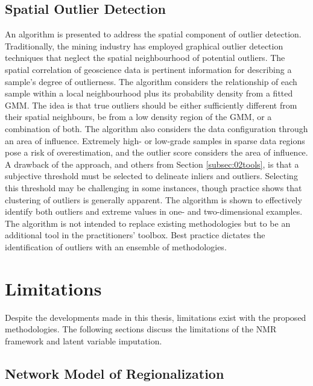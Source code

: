 \subsection{Spatial Outlier Detection}
\label{subsec:07outlier}

An algorithm is presented to address the spatial component of outlier detection. Traditionally, the mining industry has employed graphical outlier detection techniques that neglect the spatial neighbourhood of potential outliers. The spatial correlation of geoscience data is pertinent information for describing a sample's degree of outlierness. The algorithm considers the relationship of each sample within a local neighbourhood plus its probability density from a fitted \gls{GMM}. The idea is that true outliers should be either sufficiently different from their spatial neighbours, be from a low density region of the \gls{GMM}, or a combination of both. The algorithm also considers the data configuration through an area of influence. Extremely high- or low-grade samples in sparse data regions pose a risk of overestimation, and the outlier score considers the area of influence. A drawback of the approach, and others from Section \ref{subsec:02tools}, is that a subjective threshold must be selected to delineate inliers and outliers. Selecting this threshold may be challenging in some instances, though practice shows that clustering of outliers is generally apparent. The algorithm is shown to effectively identify both outliers and extreme values in one- and two-dimensional examples. The algorithm is not intended to replace existing methodologies but to be an additional tool in the practitioners' toolbox. Best practice dictates the identification of outliers with an ensemble of methodologies.

\FloatBarrier
\section{Limitations}
\label{sec:07limit}

Despite the developments made in this thesis, limitations exist with the proposed methodologies. The following sections discuss the limitations of the \gls{NMR} framework and latent variable imputation.

\subsection{Network Model of Regionalization}
\label{subsec:07nmr2}

